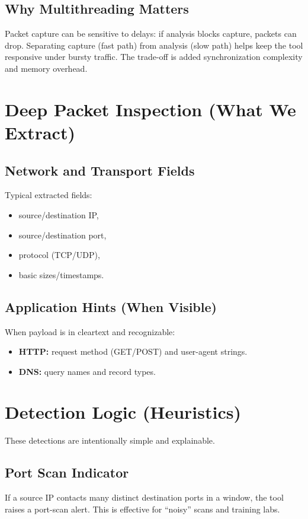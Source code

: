 \documentclass[14pt]{extarticle}
\begin{document}
\subsection{Why Multithreading Matters}
Packet capture can be sensitive to delays: if analysis blocks capture, packets can drop. Separating capture (fast path) from analysis (slow path) helps keep the tool responsive under bursty traffic. The trade-off is added synchronization complexity and memory overhead.

\section{Deep Packet Inspection (What We Extract)}
\subsection{Network and Transport Fields}
Typical extracted fields:
\begin{itemize}
  \item source/destination IP,
  \item source/destination port,
  \item protocol (TCP/UDP),
  \item basic sizes/timestamps.
\end{itemize}

\subsection{Application Hints (When Visible)}
When payload is in cleartext and recognizable:
\begin{itemize}
  \item \textbf{HTTP:} request method (GET/POST) and user-agent strings.
  \item \textbf{DNS:} query names and record types.
\end{itemize}

\section{Detection Logic (Heuristics)}
These detections are intentionally simple and explainable.

\subsection{Port Scan Indicator}
If a source IP contacts many distinct destination ports in a window, the tool raises a port-scan alert. This is effective for ``noisy'' scans and training labs.
\end{document}
